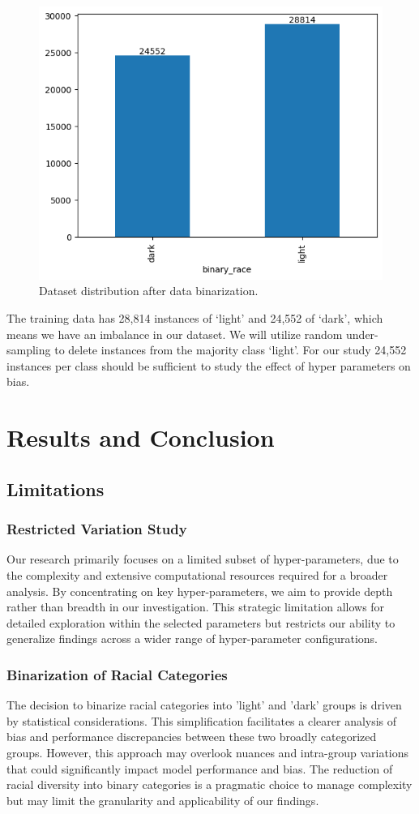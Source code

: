 \documentclass[conference]{IEEEtran}
\begin{document}
\begin{figure}
    \centerline{\includegraphics[width=0.8\linewidth]{latex/images/RegroupDistributionFairFace.png}}
    \caption{Dataset distribution after data binarization.}
    \label{binarized_data}
\end{figure}

The training data has 28,814 instances of ‘light’ and 24,552 of ‘dark’, which means we have an imbalance in our dataset. We will utilize random under-sampling to delete instances from the majority class ‘light’. For our study 24,552 instances per class should be sufficient to study the effect of hyper parameters on bias.

\section{Results and Conclusion}
\subsection{Limitations}
\subsubsection{Restricted Variation Study}
Our research primarily focuses on a limited subset of hyper-parameters, due to the complexity and extensive computational resources required for a broader analysis. By concentrating on key hyper-parameters, we aim to provide depth rather than breadth in our investigation. This strategic limitation allows for detailed exploration within the selected parameters but restricts our ability to generalize findings across a wider range of hyper-parameter configurations.
\subsubsection{Binarization of Racial Categories}
The decision to binarize racial categories into 'light' and 'dark' groups is driven by statistical considerations. This simplification facilitates a clearer analysis of bias and performance discrepancies between these two broadly categorized groups. However, this approach may overlook nuances and intra-group variations that could significantly impact model performance and bias. The reduction of racial diversity into binary categories is a pragmatic choice to manage complexity but may limit the granularity and applicability of our findings.
\end{document}
